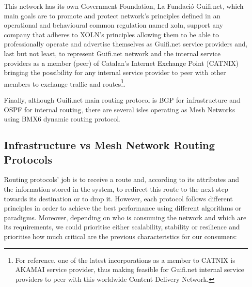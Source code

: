 This network has its own Government Foundation, La Fundació Guifi.net, which main goals are to promote and protect network's principles defined in an operational and behavioural common regulation named \Gls{xoln}, support any company that adheres to XOLN's principles allowing them to be able to professionally operate and advertise themselves as Guifi.net service providers and, last but not least, to represent Guifi.net network and the internal service providers as a member (peer) of Catalan's Internet Exchange Point (CATNIX) bringing the possibility for any internal service provider to peer with other members to exchange traffic and routes\footnote{For reference, one of the latest incorporations as a member to CATNIX is AKAMAI service provider, thus making feasible for Guifi.net internal service providers to peer with this worldwide Content Delivery Network.}.

Finally, although Guifi.net main routing protocol is BGP for infrastructure and OSPF for internal routing, there are several isles operating as Mesh Networks using BMX6 dynamic routing protocol.


\subsection{Infrastructure vs Mesh Network Routing Protocols}
\label{subsec:dsrp}
Routing protocols' job is to receive a route and, according to its attributes and the information stored in the system, to redirect this route to the next step towards its destination or to drop it. However, each protocol follows different principles in order to achieve the best performance using different algorithms or paradigms. Moreover, depending on who is consuming the network and which are its requirements, we could prioritise either scalability, stability or resilience and prioritise how much critical are the previous characteristics for our consumers:

